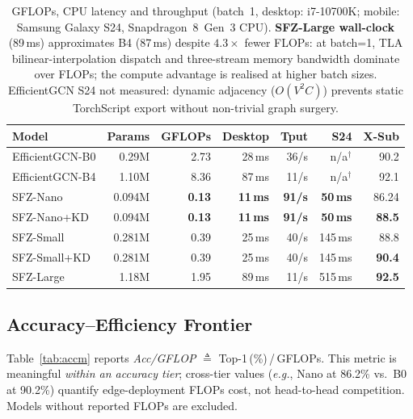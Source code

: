\documentclass[sigconf,screen,review,anonymous]{acmart}
\newcommand{\best}[1]{{\color{bestcol}\textbf{#1}}}
\newcommand{\eg}{\emph{e.g.}}
\begin{document}
\begin{table}[t]
\centering
\caption{GFLOPs, CPU latency and throughput (batch~1, desktop: i7-10700K;
  mobile: Samsung Galaxy S24, Snapdragon~8~Gen~3 CPU).
  \textbf{SFZ-Large wall-clock} (89\,ms) approximates B4 (87\,ms) despite
  $4.3{\times}$ fewer FLOPs: at batch=1, TLA bilinear-interpolation dispatch
  and three-stream memory bandwidth dominate over FLOPs; the compute advantage
  is realised at higher batch sizes.
  EfficientGCN S24 not measured: dynamic adjacency ($O(V^2\!C)$) prevents
  static TorchScript export without non-trivial graph surgery.}
\label{tab:gflops}
\setlength{\tabcolsep}{2.2pt}
\renewcommand{\arraystretch}{1.02}
\begin{tabular}{lrrrrrr}
\toprule
Model & Params & GFLOPs & Desktop & Tput & S24 & X-Sub \\
\midrule
EfficientGCN-B0 & 0.29M & 2.73 & 28\,ms & 36/s & n/a$^\dagger$ & 90.2 \\
EfficientGCN-B4 & 1.10M & 8.36 & 87\,ms & 11/s & n/a$^\dagger$ & 92.1 \\
\midrule
SFZ-Nano        & 0.094M & \best{0.13} & \best{11\,ms} & \best{91/s} & \best{50\,ms} & 86.24 \\
SFZ-Nano+KD     & 0.094M & \best{0.13} & \best{11\,ms} & \best{91/s} & \best{50\,ms} & \best{88.5} \\
SFZ-Small       & 0.281M & 0.39 & 25\,ms & 40/s & 145\,ms & 88.8 \\
SFZ-Small+KD    & 0.281M & 0.39 & 25\,ms & 40/s & 145\,ms & \best{90.4} \\
SFZ-Large       & 1.18M & 1.95 & 89\,ms & 11/s & 515\,ms & \best{92.5} \\
\bottomrule
\end{tabular}
\vspace{-3mm}\end{table}

\subsection{Accuracy--Efficiency Frontier}\label{sec:frontier}

Table~\ref{tab:accm} reports \emph{Acc/GFLOP} $\triangleq$ Top-1\,(\%)\,/\,GFLOPs.
This metric is meaningful \emph{within an accuracy tier}; cross-tier values
(\eg, Nano at 86.2\% vs.\ B0 at 90.2\%) quantify edge-deployment FLOPs cost,
not head-to-head competition. Models without reported FLOPs are excluded.
\end{document}
